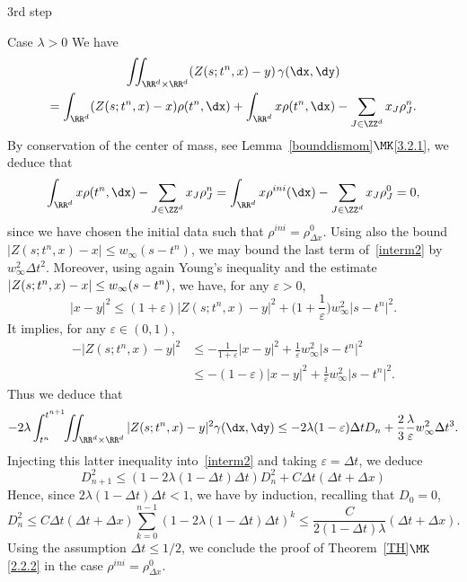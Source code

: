 \begin{step}{3rd step}
\begin{step}{Case $\lambda>0$}
We have
\begin{multline*}
\iint_{\RR^d\times \RR^d} (Z(s;t^n,x)-y )\,\gamma(\dx,\dy)\\
= \int_{\RR^d} (Z(s;t^n,x)-x)\rho(t^n,\dx) + \int_{\RR^d} x \rho(t^n,\dx) - \sum_{J\in\ZZ^d} x_J \rho_J^n.
\end{multline*}
By conservation of the center of mass, see Lemma~\ref{bounddismom}$\MK$\eqref{3.2.1}, we deduce that
\[
\int_{\RR^d} x \rho(t^n,\dx) - \sum_{J\in\ZZ^d} x_J \rho_J^n =
\int_{\RR^d} x \rho^{ini}(\dx) - \sum_{J\in\ZZ^d} x_J \rho_J^0 = 0,
\]
since we have chosen the initial data such that $\rho^{ini}=\rho_{\Delta x}^0$. Using also the bound $|Z(s;t^n,x)-x| \leq w_\infty (s-t^n)$, we may bound the last term of~\eqref{interm2} by $w_\infty^2 \Delta t^2$. Moreover, using again Young's inequality and the estimate $|Z(s;t^n,x)-x| \leq\linebreak w_\infty (s-t^n)$, we have, for any $\varepsilon>0$,
\[
|x - y|^2 \leq (1+\varepsilon) |Z(s;t^n,x)-y |^2 + \Big(1+\frac{1}{\varepsilon}\Big) w_\infty^2 |s-t^n|^2.
\]
It implies, for any $\varepsilon\in (0,1)$,
\begin{align*}
- |Z(s;t^n,x)-y |^2 & \leq - \frac{1}{1+\varepsilon} |x-y|^2 + \frac{1}{\varepsilon} w_\infty^2 |s-t^n|^2 \\
& \leq -(1-\varepsilon) |x-y|^2 + \frac{1}{\varepsilon} w_\infty^2 |s-t^n|^2.
\end{align*}
Thus we deduce that
\[
- 2 \lambda \int_{t^n}^{t^{n+1}}\!\! \iint_{\RR^d\times\RR^d} |Z(s;t^n,x)-y |^2 \gamma(\dx,\dy)
\leq -2 \lambda (1-\varepsilon) \Delta t D_n + \frac 23 \frac{\lambda}{\varepsilon} w_\infty^2 \Delta t^3.
\]
Injecting this latter inequality into~\eqref{interm2} and taking $\varepsilon=\Delta t$, we deduce
\[
D_{n+1}^2 \leq (1-2\lambda (1-\Delta t)\Delta t ) D_n^2 + C \Delta t(\Delta t+\Delta x)
\]
Hence, since $2\lambda (1-\Delta t)\Delta t<1$, we have by induction, recalling that $D_0=0$,
\[
D_n^2 \leq C \Delta t(\Delta t+\Delta x) \sum_{k=0}^{n-1} (1-2\lambda (1-\Delta t)\Delta t
)^{k} \leq \frac{C}{2(1-\Delta t)\lambda} (\Delta t+\Delta x).
\]
Using the assumption $\Delta t \leq 1/2$, we conclude the proof of Theorem~\ref{TH}$\MK$\eqref{2.2.2} in the case $\rho^{ini}=\rho_{\Delta x}^0$.
\end{step}
\end{step}

